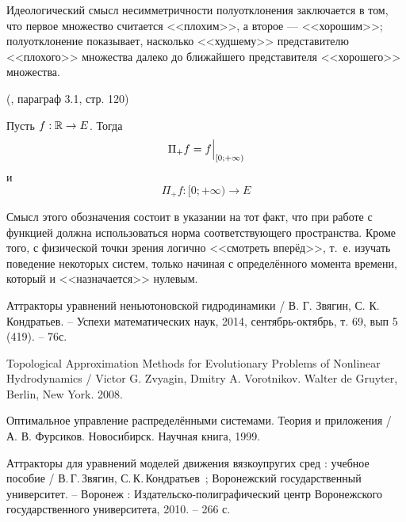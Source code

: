 Идеологический смысл несимметричности полуотклонения заключается в том,
что первое множество считается <<плохим>>, а второе --- <<хорошим>>;
полуотклонение показывает, насколько <<худшему>> представителю <<плохого>> множества далеко до ближайшего представителя <<хорошего>> множества.



\opred (\cite{Zelenaya}, параграф 3.1, стр. 120)

Пусть $f:\mathbb{R}\to E$.
Тогда
$$
	\Pi_+f = \Bigl. f \Bigr|_{[0;+\infty)}
$$
и
$$
	\Pi_+f:[0; +\infty) \to E
$$

Смысл этого обозначения состоит в указании на тот факт, что при работе с функцией должна использоваться норма соответствующего пространства.
Кроме того, с физической точки зрения логично <<смотреть вперёд>>, т.~е. изучать поведение некоторых систем, только начиная с определённого момента времени, который и <<назначается>> нулевым.

\begin{thebibliography}{99}

 Аттракторы уравнений неньютоновской гидродинамики / В. Г. Звягин, С. К. Кондратьев. – Успехи математических наук, 2014, сентябрь-октябрь, т. 69, вып 5 (419). – 76с.

 Topological Approximation Methods for Evolutionary Problems of Nonlinear Hydrodynamics / Victor G. Zvyagin, Dmitry A. Vorotnikov. Walter de Gruyter, Berlin, New York. 2008.

 Оптимальное управление распределёнными системами. Теория и приложения / А. В. Фурсиков. Новосибирск. Научная книга, 1999.

 Аттракторы для уравнений моделей движения вязкоупругих сред : учебное пособие / В.\,Г.\,Звягин, С.\,К.\,Кондратьев~; Воронежский государственный университет. -- Воронеж : Издательско-полиграфический центр Воронежского государственного университета, 2010. -- 266 с.


\end{thebibliography}


